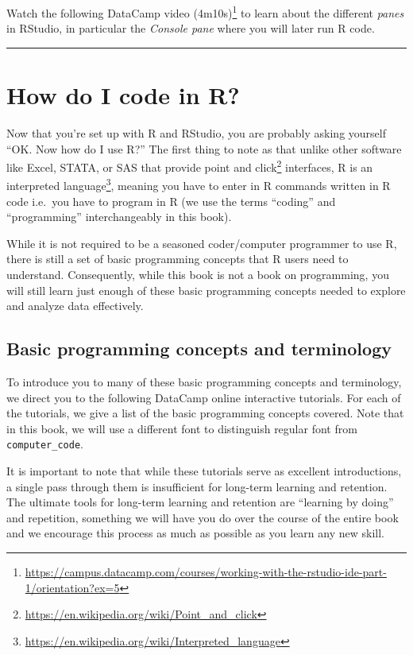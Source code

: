 \documentclass[12pt,]{krantz}
\renewcommand{\href}[2]{#2\footnote{\url{#1}}}
\theoremstyle{definition}
\theoremstyle{definition}
\theoremstyle{definition}
\theoremstyle{remark}
\begin{document}
Watch the following
\href{https://campus.datacamp.com/courses/working-with-the-rstudio-ide-part-1/orientation?ex=5}{DataCamp
video (4m10s)} to learn about the different \emph{panes} in RStudio, in
particular the \emph{Console pane} where you will later run R code.

\begin{center}\rule{0.5\linewidth}{\linethickness}\end{center}

\section{How do I code in R?}\label{code}

Now that you're set up with R and RStudio, you are probably asking
yourself ``OK. Now how do I use R?'' The first thing to note as that
unlike other software like Excel, STATA, or SAS that provide
\href{https://en.wikipedia.org/wiki/Point_and_click}{point and click}
interfaces, R is an
\href{https://en.wikipedia.org/wiki/Interpreted_language}{interpreted
language}, meaning you have to enter in R commands written in R code
i.e.~you have to program in R (we use the terms ``coding'' and
``programming'' interchangeably in this book).

While it is not required to be a seasoned coder/computer programmer to
use R, there is still a set of basic programming concepts that R users
need to understand. Consequently, while this book is not a book on
programming, you will still learn just enough of these basic programming
concepts needed to explore and analyze data effectively.

\subsection{Basic programming concepts and
terminology}\label{programming-concepts}

To introduce you to many of these basic programming concepts and
terminology, we direct you to the following DataCamp online interactive
tutorials. For each of the tutorials, we give a list of the basic
programming concepts covered. Note that in this book, we will use a
different font to distinguish regular font from \texttt{computer\_code}.

It is important to note that while these tutorials serve as excellent
introductions, a single pass through them is insufficient for long-term
learning and retention. The ultimate tools for long-term learning and
retention are ``learning by doing'' and repetition, something we will
have you do over the course of the entire book and we encourage this
process as much as possible as you learn any new skill.
\end{document}
